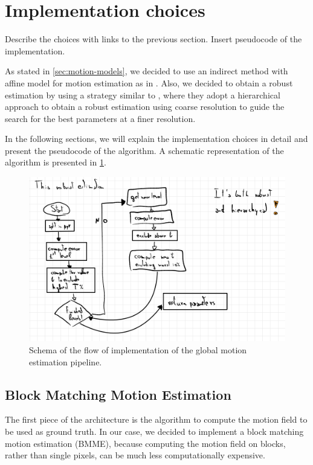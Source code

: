 \section{Implementation choices}
\label{sec:03-implementation}
Describe the choices with links to the previous section.
Insert pseudocode of the implementation.

As stated in \cref{sec:motion-models}, we decided to use an indirect method with affine model for motion estimation as in \cite{Bergen92}.
Also, we decided to obtain a robust estimation by using a strategy similar to \cite{Dufeaux2000}, where they adopt a hierarchical approach to obtain a robust estimation using coarse resolution to guide the search for the best parameters at a finer resolution.

In the following sections, we will explain the implementation choices in detail and present the pseudocode of the algorithm. A schematic representation of the algorithm is presented in \cref{fig:gme-schema}.

\begin{figure}
    \centering
    \includegraphics[width=.95\linewidth]{../assets/images/gme-schema.png}
    \caption{Schema of the flow of implementation of the global motion estimation pipeline.}
    \label{fig:gme-schema}
\end{figure}

\subsection{Block Matching Motion Estimation}
\label{sec:BMME}
The first piece of the architecture is the algorithm to compute the motion field to be used as ground truth.
In our case, we decided to implement a block matching motion estimation (BMME), because computing the motion field on blocks, rather than single pixels, can be much less computationally expensive.

